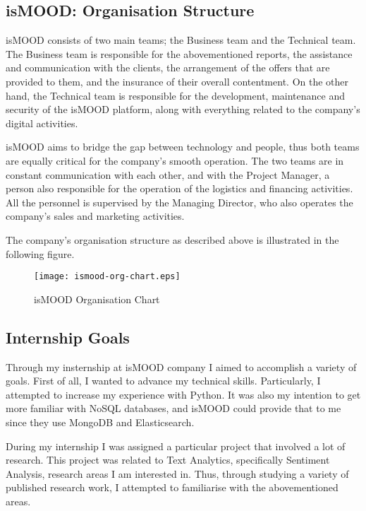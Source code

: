 \subsection{isMOOD: Organisation Structure}
\label{subsec:ismood-structure}

isMOOD consists of two main teams;
the Business team and the Technical team.
The Business team is responsible
for the abovementioned reports,
the assistance and communication with the clients,
the arrangement of the offers that are provided to them,
and the insurance of their overall contentment.
On the other hand, the Technical team is responsible
for the development, maintenance and security
of the isMOOD platform,
along with everything related to the company's digital activities.

isMOOD aims to bridge the gap between technology and people,
thus both teams are equally critical
for the company's smooth operation.
The two teams are in constant communication with each other,
and with the Project Manager,
a person also responsible
for the operation of the logistics and financing activities.
All the personnel is supervised by the Managing Director,
who also operates the company's sales and marketing activities.

The company's organisation structure as described above
is illustrated in the following figure.

\begin{figure}[ht]
\centering
\texttt{[image: ismood-org-chart.eps]}
\caption{isMOOD Organisation Chart}
\label{fig:ismood-org-chart}
\end{figure}

\subsection{Internship Goals}
\label{subsec:internship-goals}

Through my insternship at isMOOD company
I aimed to accomplish a variety of goals.
First of all, I wanted to advance my technical skills.
Particularly, I attempted to increase my experience with Python.
It was also my intention to get more familiar with NoSQL databases,
and isMOOD could provide that to me
since they use MongoDB and Elasticsearch.

During my internship I was assigned a particular project
that involved a lot of research.
This project was related to Text Analytics,
specifically Sentiment Analysis,
research areas I am interested in.
Thus, through studying a variety of published research work,
I attempted to familiarise with the abovementioned areas.

